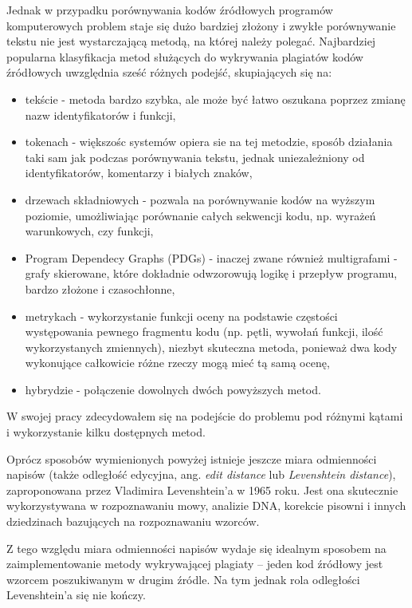 \documentclass[a4paper,12pt]{article}
\begin{document}
Jednak w przypadku porównywania kodów źródłowych programów komputerowych problem staje się dużo bardziej złożony i zwykłe porównywanie tekstu nie jest wystarczającą metodą, na której należy polegać\cite{arwin2006}. Najbardziej popularna klasyfikacja metod służących do wykrywania plagiatów kodów źródłowych uwzględnia sześć różnych podejść, skupiających się na\cite{roycordy2007}:
\begin{itemize}
\item tekście - metoda bardzo szybka, ale może być łatwo oszukana poprzez zmianę nazw identyfikatorów i funkcji,
\item tokenach - większośc systemów opiera sie na tej metodzie, sposób działania taki sam jak podczas porównywania tekstu, jednak uniezależniony od identyfikatorów, komentarzy i białych znaków,
\item drzewach składniowych - pozwala na porównywanie kodów na wyższym poziomie, umożliwiając porównanie całych sekwencji kodu, np. wyrażeń warunkowych, czy funkcji,
\item Program Dependecy Graphs (PDGs) - inaczej zwane również multigrafami - grafy skierowane, które dokładnie odwzorowują logikę i przepływ programu, bardzo złożone i czasochłonne,
\item metrykach - wykorzystanie funkcji oceny na podstawie częstości występowania pewnego fragmentu kodu (np. pętli, wywołań funkcji, ilość wykorzystanych zmiennych), niezbyt skuteczna metoda, ponieważ dwa kody wykonujące całkowicie różne rzeczy mogą mieć tą samą ocenę,
\item hybrydzie - połączenie dowolnych dwóch powyższych metod.
\end{itemize}

W swojej pracy zdecydowałem się na podejście do problemu pod różnymi kątami i wykorzystanie kilku dostępnych metod.

Oprócz sposobów wymienionych powyżej istnieje jeszcze miara odmienności napisów (także odległość edycyjna, ang. \textit{edit distance} lub \textit{Levenshtein distance}), zaproponowana przez Vladimira Levenshtein'a w 1965 roku\cite{editdistance}. Jest ona skutecznie wykorzystywana w rozpoznawaniu mowy, analizie DNA, korekcie pisowni i innych dziedzinach bazujących na rozpoznawaniu wzorców.

Z tego względu miara odmienności napisów wydaje się idealnym sposobem na zaimplementowanie metody wykrywającej plagiaty -- jeden kod źródłowy jest wzorcem poszukiwanym w drugim źródle. Na tym jednak rola odległości Levenshtein'a się nie kończy. 
\end{document}
